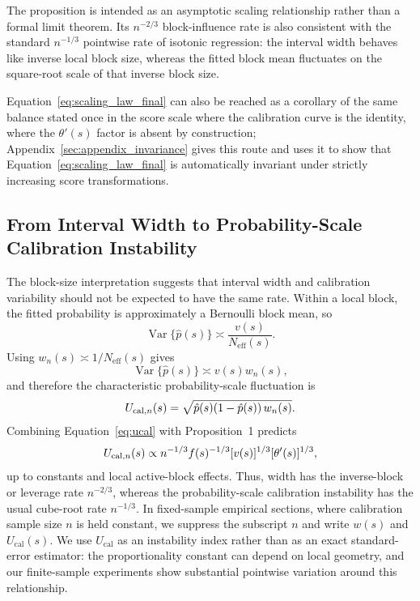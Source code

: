 \documentclass[11pt]{article}
\begin{document}
	The proposition is intended as an asymptotic scaling relationship rather than a formal limit theorem. Its $n^{-2/3}$ block-influence rate is also consistent with the standard $n^{-1/3}$ pointwise rate of isotonic regression: the interval width behaves like inverse local block size, whereas the fitted block mean fluctuates on the square-root scale of that inverse block size.

	Equation~\ref{eq:scaling_law_final} can also be reached as a corollary of the same balance stated once in the score scale where the calibration curve is the identity, where the $\theta'(s)$ factor is absent by construction; Appendix~\ref{sec:appendix_invariance} gives this route and uses it to show that Equation~\ref{eq:scaling_law_final} is automatically invariant under strictly increasing score transformations.
	
	\subsection{From Interval Width to Probability-Scale Calibration Instability}
	\label{subsec:ucal_theory}
	
	The block-size interpretation suggests that interval width and calibration variability should not be expected to have the same rate. Within a local block, the fitted probability is approximately a Bernoulli block mean, so
	\begin{equation}
		\operatorname{Var}\{\hat p(s)\}
		\asymp
		\frac{v(s)}{N_{\mathrm{eff}}(s)}.
	\end{equation}
	Using $w_n(s)\asymp1/N_{\mathrm{eff}}(s)$ gives
	\begin{equation}
		\operatorname{Var}\{\hat p(s)\}
		\asymp
		v(s)w_n(s),
		\label{eq:variance_width_relation}
	\end{equation}
	and therefore the characteristic probability-scale fluctuation is
	\begin{equation}
		U_{{\rm cal},n}(s)
		=
		\sqrt{\hat p(s)(1-\hat p(s))\,w_n(s)}.
		\label{eq:ucal}
	\end{equation}
	Combining Equation~\ref{eq:ucal} with Proposition~1 predicts
	\begin{equation}
		U_{{\rm cal},n}(s)
		\propto
		n^{-1/3}f(s)^{-1/3}
		[v(s)]^{1/3}
		[\theta'(s)]^{1/3},
		\label{eq:ucal_scaling}
	\end{equation}
	up to constants and local active-block effects. Thus, width has the inverse-block or leverage rate $n^{-2/3}$, whereas the probability-scale calibration instability has the usual cube-root rate $n^{-1/3}$. In fixed-sample empirical sections, where calibration sample size $n$ is held constant, we suppress the subscript $n$ and write $w(s)$ and $U_{\mathrm{cal}}(s)$. We use $U_{\mathrm{cal}}$ as an instability index rather than as an exact standard-error estimator: the proportionality constant can depend on local geometry, and our finite-sample experiments show substantial pointwise variation around this relationship.
	
\end{document}
